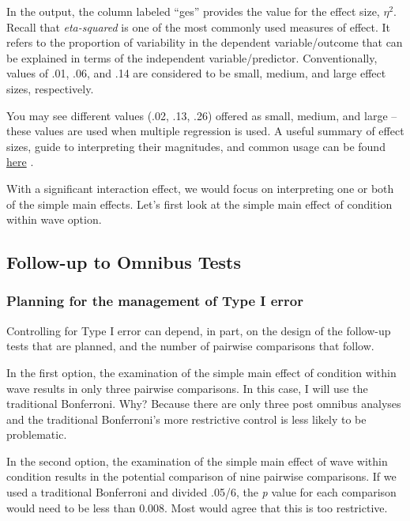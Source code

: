 \documentclass[
  11pt,
]{book}
\begin{document}
In the output, the column labeled ``ges'' provides the value for the effect size, \(\eta^{2}\). Recall that \emph{eta-squared} is one of the most commonly used measures of effect. It refers to the proportion of variability in the dependent variable/outcome that can be explained in terms of the independent variable/predictor. Conventionally, values of .01, .06, and .14 are considered to be small, medium, and large effect sizes, respectively.

You may see different values (.02, .13, .26) offered as small, medium, and large -- these values are used when multiple regression is used. A useful summary of effect sizes, guide to interpreting their magnitudes, and common usage can be found \href{https://imaging.mrc-cbu.cam.ac.uk/statswiki/FAQ/effectSize}{here} \citep{watson_rules_2020}.

With a significant interaction effect, we would focus on interpreting one or both of the simple main effects. Let's first look at the simple main effect of condition within wave option.

\hypertarget{follow-up-to-omnibus-tests}{%
\subsection{Follow-up to Omnibus Tests}\label{follow-up-to-omnibus-tests}}

\hypertarget{planning-for-the-management-of-type-i-error-2}{%
\subsubsection{Planning for the management of Type I error}\label{planning-for-the-management-of-type-i-error-2}}

Controlling for Type I error can depend, in part, on the design of the follow-up tests that are planned, and the number of pairwise comparisons that follow.

In the first option, the examination of the simple main effect of condition within wave results in only three pairwise comparisons. In this case, I will use the traditional Bonferroni. Why? Because there are only three post omnibus analyses and the traditional Bonferroni's more restrictive control is less likely to be problematic.

In the second option, the examination of the simple main effect of wave within condition results in the potential comparison of nine pairwise comparisons. If we used a traditional Bonferroni and divided .05/6, the \emph{p} value for each comparison would need to be less than 0.008. Most would agree that this is too restrictive.
\end{document}
